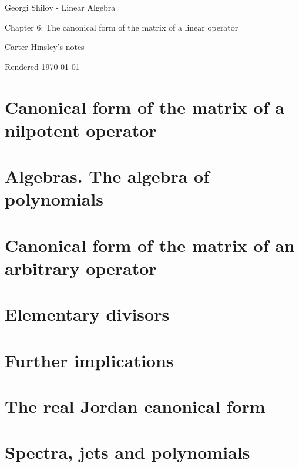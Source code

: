 \documentclass[a4paper]{article}
\begin{document}
\begin{center}
\LARGE{Georgi Shilov - Linear Algebra}

\Large{Chapter 6: The canonical form of the matrix of a linear operator}

\large{Carter Hinsley's notes}

Rendered \today
\end{center}

\section{Canonical form of the matrix of a nilpotent operator}

\section{Algebras. The algebra of polynomials}

\section{Canonical form of the matrix of an arbitrary operator}

\section{Elementary divisors}

\section{Further implications}

\section{The real Jordan canonical form}

\section{Spectra, jets and polynomials}
\end{document}
